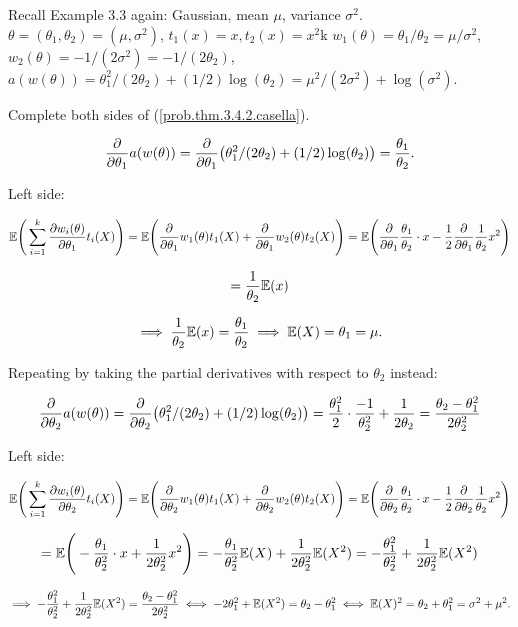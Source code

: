 \begin{example} Recall Example 3.3 again: Gaussian, mean \(\mu\), variance \(\sigma^2\). \(\theta = (\theta_1, \theta_2) = (\mu, \sigma^2)\), \(t_1(x) = x, t_2(x) = x^2\)k \(w_1(\theta) = \theta_1/\theta_2 = \mu/\sigma^2\), \(w_2(\theta) = - 1/(2\sigma^2) = -1/(2\theta_2)\), \(a(w(\theta)) = \theta_1^2/(2\theta_2) + (1/2) \log(\theta_2) = \mu^2/(2 \sigma^2) + \log(\sigma^2)\).

Complete both sides of (\ref{prob.thm.3.4.2.casella}).

\[
\pderiv{}{\theta_1}  a(w(\theta)) = \pderiv{}{\theta_1} \big( \theta_1^2/(2\theta_2) + (1/2) \log(\theta_2) \big) = \frac{\theta_1}{\theta_2}.
\]


Left side:

\[
\E \Bigg( \sum_{i=1}^k \pderiv{w_i(\theta)}{\theta_1} t_i(X) \Bigg) = \E \Bigg( \pderiv{}{\theta_1}w_1(\theta) t_1(X) +\pderiv{}{\theta_1}w_2(\theta) t_2(X) \Bigg) = \E \Bigg( \pderiv{}{\theta_1}\frac{\theta_1}{\theta_2} \cdot x - \frac{1}{2} \pderiv{}{\theta_1}\frac{1}{\theta_2} x^2 \Bigg) 
\]

\[
= \frac{1}{\theta_2}  \E ( x )
\]



\[
\implies  \frac{1}{\theta_2}  \E ( x ) =  \frac{\theta_1}{\theta_2} \implies \E(X) = \theta_1 = \mu.
\]

Repeating by taking the partial derivatives with respect to \(\theta_2\) instead:

\[
\pderiv{}{\theta_2}  a(w(\theta)) = \pderiv{}{\theta_2} \big( \theta_1^2/(2\theta_2) + (1/2) \log(\theta_2) \big) = \frac{\theta_1^2}{2} \cdot \frac{-1}{\theta_2^2} + \frac{1}{2 \theta_2} = \frac{\theta_2 - \theta_1^2}{2 \theta_2^2}
\]

Left side:

\[
\E \Bigg( \sum_{i=1}^k \pderiv{w_i(\theta)}{\theta_2} t_i(X) \Bigg) = \E \Bigg( \pderiv{}{\theta_2}w_1(\theta) t_1(X) +\pderiv{}{\theta_2}w_2(\theta) t_2(X) \Bigg) = \E \Bigg( \pderiv{}{\theta_2}\frac{\theta_1}{\theta_2} \cdot x - \frac{1}{2} \pderiv{}{\theta_2}\frac{1}{\theta_2} x^2 \Bigg) 
\]

\[
 = \E \Bigg( -\frac{\theta_1}{\theta_2^2} \cdot x +  \frac{1}{2 \theta_2^2} x^2 \Bigg) = -\frac{\theta_1}{\theta_2^2} \E(X) +  \frac{1}{2 \theta_2^2}\E(X^2) =  -\frac{\theta_1^2}{\theta_2^2} +  \frac{1}{2 \theta_2^2}\E(X^2)
 \]
 
 \[
 \implies  -\frac{\theta_1^2}{\theta_2^2} +  \frac{1}{2 \theta_2^2}\E(X^2) =  \frac{\theta_2 - \theta_1^2}{2 \theta_2^2} \iff -2 \theta_1^2 + \E(X^2) = \theta_2 - \theta_1^2 \iff \E(X)^2 = \theta_2 + \theta_1^2 = \sigma^2 + \mu^2.
 \]


\end{example}


